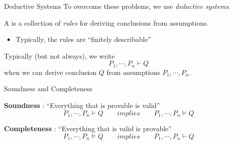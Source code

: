 \documentclass[xetex,aspectratio=169,14pt,hyperref={pdfpagelabels=true,pdflang={en-GB}}]{beamer}
\begin{document}
\begin{frame}
  {Deductive Systems}
  To overcome these problems, we use \emph{deductive systems}.

  \bigskip

  A  is a collection of \emph{rules} for
  deriving conclusions from assumptions.
  \begin{itemize}
  \item Typically, the rules are ``finitely describable'' \\
  \end{itemize}

  \bigskip

  Typically (but not always), we write
  \begin{displaymath}
    P_1, \cdots, P_n \vdash Q
  \end{displaymath}
  when we can derive conclusion $Q$ from assumptions $P_1, \cdots, P_n$.


\end{frame}

\begin{frame}
  {Soundness and Completeness}

  \textbf{Soundness} : ``Everything that is provable is valid''
  \begin{displaymath}
    P_1, \cdots, P_n \vdash Q \qquad \textit{implies} \qquad P_1, \cdots, P_n \models Q
  \end{displaymath}

  \bigskip

  \textbf{Completeness} : ``Everything that is valid is provable''
  \begin{displaymath}
    P_1, \cdots, P_n \models Q \qquad \textit{implies} \qquad P_1, \cdots, P_n \vdash Q
  \end{displaymath}

\end{frame}
\end{document}
